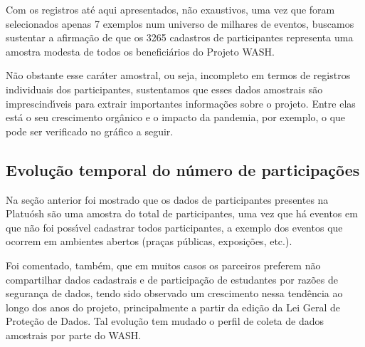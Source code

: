\documentclass[
12pt,		%
openright,	%
twoside,  %
a4paper,			%
chapter=TITLE,		%
english,			%
french,				%
spanish,			%
brazil				%
]{USPSC-classe/USPSC}
\begin{document}
Com os registros at\'e aqui apresentados, n\~ao exaustivos, uma vez que foram selecionados apenas 7 exemplos num universo de milhares de eventos, buscamos sustentar a afirma\c{c}\~ao de que os 3265 cadastros de participantes representa uma amostra modesta de todos os benefici\'arios do Projeto WASH.










N\~ao obstante esse car\'ater amostral, ou seja, incompleto em termos de registros individuais dos participantes, sustentamos que esses dados amostrais s\~ao imprescind\'{\i}veis para extrair importantes informa\c{c}\~oes sobre o projeto. Entre elas est\'a o seu crescimento org\^anico e o impacto da pandemia, por exemplo, o que pode ser verificado no gr\'afico a seguir.










\subsection[Evolu\c{c}\~ao temporal do n\'umero de participa\c{c}\~oes]{Evolu\c{c}\~ao temporal do n\'umero de participa\c{c}\~oes}\label{Evolu\c{c}\~ao temporal do n\'umero de participa\c{c}\~oes}
Na se\c{c}\~ao anterior foi mostrado que os dados de participantes presentes na Platu\'osh s\~ao uma amostra do total de participantes, uma vez que h\'a eventos em que n\~ao foi poss\'{\i}vel cadastrar todos participantes, a exemplo dos eventos que ocorrem em ambientes abertos (pra\c{c}as p\'ublicas, exposi\c{c}\~oes, etc.).










Foi comentado, tamb\'em, que em muitos casos os parceiros preferem n\~ao compartilhar dados cadastrais e de participa\c{c}\~ao de estudantes por raz\~oes de seguran\c{c}a de dados, tendo sido observado um crescimento nessa tend\^encia ao longo dos anos do projeto, principalmente a partir da edi\c{c}\~ao da Lei Geral de Prote\c{c}\~ao de Dados. Tal evolu\c{c}\~ao tem mudado o perfil de coleta de dados amostrais por parte do WASH.
\end{document}
